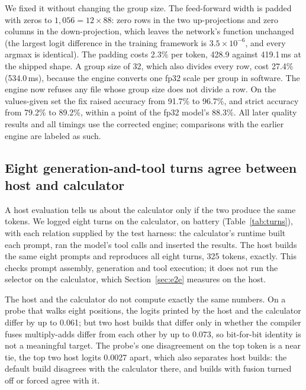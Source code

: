 \documentclass[10pt]{article}
\begin{document}
We fixed it without changing the group size. The feed-forward width is padded with zeros to
$1{,}056 = 12 \times 88$: zero rows in the two up-projections and zero columns in the down-projection,
which leaves the network's function unchanged (the largest logit difference in the training framework
is $3.5\times10^{-6}$, and every argmax is identical). The padding costs 2.3\% per token, 428.9 against
419.1\,ms at the shipped shape. A group size of 32, which also divides every row, cost 27.4\% (534.0\,ms),
because the engine converts one fp32 scale per group in software. The engine now refuses any file whose
group size does not divide a row. On the values-given set the fix raised accuracy from 91.7\% to 96.7\%,
and strict accuracy from 79.2\% to 89.2\%, within a point of the fp32 model's 88.3\%. All later quality
results and all timings use the corrected engine; comparisons with the earlier engine are labeled as such.

\subsection{Eight generation-and-tool turns agree between host and calculator}
\label{sec:parity}

A host evaluation tells us about the calculator only if the two produce the same tokens. We logged
eight turns on the calculator, on battery (Table~\ref{tab:turns}), with each relation supplied by the
test harness: the calculator's runtime built each prompt, ran the model's tool calls and inserted the
results. The host builds the same eight prompts and reproduces all eight turns, 325 tokens, exactly.
This checks prompt assembly, generation and tool execution; it does not run the selector on the
calculator, which Section~\ref{sec:e2e} measures on the host.

The host and the calculator do not compute exactly the same numbers. On a probe that walks eight positions,
the logits printed by the host and the calculator differ by up to 0.061; but two host builds that differ
only in whether the compiler fuses multiply-adds differ from each other by up to 0.073, so bit-for-bit
identity is not a meaningful target. The probe's one disagreement on the top token is a near tie, the
top two host logits 0.0027 apart, which also separates host builds: the default build disagrees with the
calculator there, and builds with fusion turned off or forced agree with it.
\end{document}
